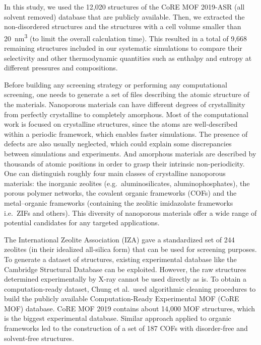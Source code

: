 \documentclass[main.tex]{subfiles}
\begin{document}
In this study, we used the 12,020 structures of the CoRE MOF 2019-ASR (all solvent removed) database that are publicly available. Then, we extracted the non-disordered structures and the structures with a cell volume smaller than \SI{20}{\nano\meter\cubed} (to limit the overall calculation time). This resulted in a total of 9,668 remaining structures included in our systematic simulations to compare their selectivity and other thermodynamic quantities such as enthalpy and entropy at different pressures and compositions.


Before building any screening strategy or performing any computational screening, one needs to generate a set of files describing the atomic structure of the materials. Nanoporous materials can have different degrees of crystallinity from perfectly crystalline to completely amorphous. Most of the computational work is focused on crystalline structures, since the atoms are well-described within a periodic framework, which enables faster simulations. The presence of defects are also usually neglected, which could explain some discrepancies between simulations and experiments. And amorphous materials are described by thousands of atomic positions in order to grasp their intrinsic non-periodicity.\cite{Thyagarajan_2020} One can distinguish roughly four main classes of crystalline nanoporous materials: the inorganic zeolites (e.g.\ aluminosilicates, aluminophosphates), the porous polymer networks, the covalent organic frameworks (COFs) and the metal--organic frameworks (containing the zeolitic imidazolate frameworks i.e.\ ZIFs and others). This diversity of nanoporous materials offer a wide range of potential candidates for any targeted applications.

The International Zeolite Association (IZA) gave a standardized set of 244 zeolites (in their idealized all-silica form) that can be used for screening purposes. To generate a dataset of structures, existing experimental database like the Cambridge Structural Database can be exploited. However, the raw structures determined experimentally by X-ray cannot be used directly as is. To obtain a computation-ready dataset, Chung et al.\ used algorithmic cleaning procedures to build the publicly available Computation-Ready Experimental MOF (CoRE MOF) database.\cite{Chung_2014, Chung_2019} CoRE MOF 2019 contains about 14,000 MOF structures, which is the biggest experimental database. Similar approach applied to organic frameworks led to the construction of a set of 187 COFs with disorder-free and solvent-free structures.\cite{Tong_2017,Ongari_2019}
\end{document}
